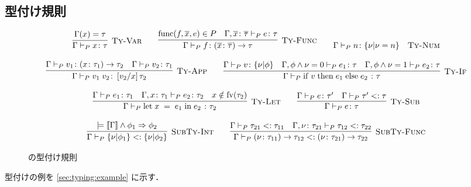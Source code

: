\subsection{型付け規則}
\label{sec:type-system}


\begin{figure}[H]
  \begin{align*}\begin{array}{c}
    \infer[\TyRuleVar] {
      \TyJudge{P}{\Gamma}{x}{\tau}
    } {
      \Gamma\paren{x} = \tau
    } \quad\quad
    \infer[\TyRuleFunc] {
      \TyJudge{P}{\Gamma}{f}{\TyFunc{\seq{x}}{\seq{\tau}}{\tau}}
    } {
      \Func{f}{\seq{x}}{e} \in P
      \quad \TyJudge{P}{\Gamma, \typed{\seq{x}}{\seq{\tau}}}{e}{\tau}
    } \quad\quad
    \TyJudge{P}{\Gamma}{n}{\TyInt{\nu}{\nu = n}} \quad \text{\TyRuleNum} \\\\
    \infer[\TyRuleApp] {
      \TyJudge{P}{\Gamma}{\App{v_1}{v_2}}{\subst{v_2}{x}{\tau_2}}
    } {
      \TyJudge{P}{\Gamma}{v_1}{\TyFunc{x}{\tau_1}{\tau_2}}
      \quad \TyJudge{P}{\Gamma}{v_2}{\tau_1}
    } \quad\quad
    \infer[\TyRuleIf] {
      \TyJudge{P}{\Gamma}{\If{\; v \;}{\; e_1 \;}{\; e_2 \;}}{\tau}
    } {
      \TyJudge{P}{\Gamma}{v}{\TyInt{\nu}{\phi}}
      \quad \TyJudge{P}{\Gamma, \FormulaAnd{\phi}{\TermEq{\nu}{0}}}{e_1}{\tau}
      \quad \TyJudge{P}{\Gamma, \FormulaAnd{\phi}{\TermEq{\nu}{1}}}{e_2}{\tau}
    } \\\\
    \infer[\TyRuleLet] {
      \TyJudge{P}{\Gamma}{\Let{\; x \;}{\; e_1 \;}{\; e_2 \;}}{\tau_2}
    } {
      \TyJudge{P}{\Gamma}{e_1}{\tau_1}
      \quad \TyJudge{P}{\Gamma, \typed{x}{\tau_1}}{e_2}{\tau_2}
      \quad x \notin \fv{\tau_2}
    } \quad\quad
    \infer[\TyRuleSub] {
      \TyJudge{P}{\Gamma}{e}{\tau}
    } {
      \TyJudge{P}{\Gamma}{e}{\tau'}
      \quad \SubTyJudge{P}{\Gamma}{\tau'}{\tau}
    } \\\\
    \infer[\SubTyRuleInt] {
      \SubTyJudge{P}{\Gamma}{\TyInt{\nu}{\phi_1}}{\TyInt{\nu}{\phi_2}}
    } {
      \models \FormulaAnd{\sem{\Gamma}}{\phi_1} \Rightarrow \phi_2
    } \quad\quad
    \infer[\SubTyRuleFunc] {
      \SubTyJudge{P}{\Gamma}{\TyFunc{\nu}{\tau_{11}}{\tau_{12}}}{\TyFunc{\nu}{\tau_{21}}{\tau_{22}}}
    } {
      \SubTyJudge{P}{\Gamma}{\tau_{21}}{\tau_{11}}
      \quad \SubTyJudge{P}{\Gamma, \typed{\nu}{\tau_{21}}}{\tau_{12}}{\tau_{22}}
    }
  \end{array}\end{align*}
  \caption{\Yil の型付け規則}
  \label{fig:typing-rules}
\end{figure}

\par 型付けの例を \ref{sec:typing:example} に示す．
